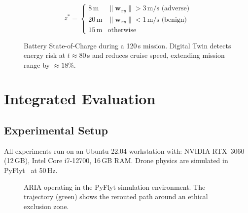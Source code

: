\documentclass[10pt,twocolumn]{article}
\begin{document}
\begin{equation}
    z^* = \begin{cases}
        8\,\text{m} & \|\mathbf{w}_{xy}\| > 3\,\text{m/s (adverse)} \\
        20\,\text{m} & \|\mathbf{w}_{xy}\| < 1\,\text{m/s (benign)} \\
        15\,\text{m} & \text{otherwise}
    \end{cases}
\end{equation}

\begin{figure}[t]
    \centering
    \caption{Battery State-of-Charge during a 120\,s mission. Digital
    Twin detects energy risk at $t{\approx}80$\,s and reduces cruise
    speed, extending mission range by ${\approx}18\%$.}
    \label{fig:energy}
\end{figure}

\section{Integrated Evaluation}
\label{sec:eval}

\subsection{Experimental Setup}
All experiments run on an Ubuntu 22.04 workstation with:
NVIDIA RTX~3060 (12\,GB), Intel Core i7-12700, 16\,GB RAM.
Drone physics are simulated in PyFlyt~\cite{pyflyt} at 50\,Hz.

\begin{figure}[t]
    \centering
    \caption{ARIA operating in the PyFlyt simulation environment.
    The trajectory (green) shows the rerouted path around an
    ethical exclusion zone.}
    \label{fig:sim_screenshot}
\end{figure}
\end{document}
